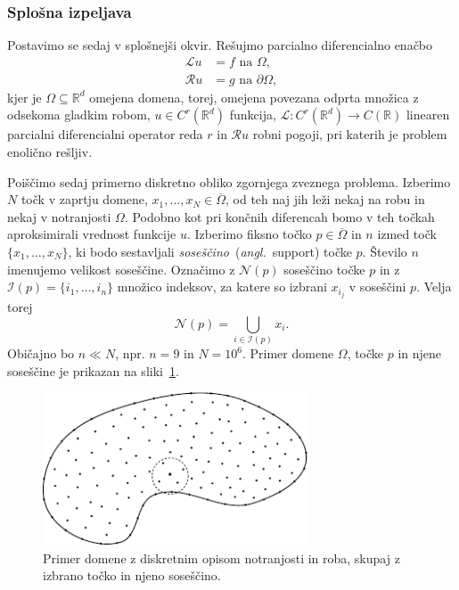 \documentclass[12pt,a4paper,twoside]{article}
\theoremstyle{definition} %
\theoremstyle{plain} %
\numberwithin{equation}{section}
\newcommand{\R}{\mathbb R}
\newcommand{\Rc}{\mathcal{R}}
\newcommand{\Nc}{\mathcal{N}}
\newcommand{\I}{\mathcal{I}}
\renewcommand{\L}{\mathcal{L}}
\newcommand{\zomega}{\overline{\Omega}}
\newcommand{\ang}[1]{(\textit{angl.}\ #1)}
\begin{document}
\subsubsection{Splošna izpeljava}
\label{sec:splosna-izpeljava}
Postavimo se sedaj v splošnejši okvir.
Rešujmo parcialno diferencialno enačbo
\begin{align}
  \L u &= f \text{ na } \Omega, \label{eq:general-problem} \\
  \Rc u &= g \text{ na } \partial \Omega \nonumber,
\end{align}
kjer je $\Omega \subseteq \R^d$ omejena domena, torej, omejena povezana odprta
množica z odsekoma gladkim robom, $u \in C^r(\R^d)$ funkcija,
$\L\colon C^r(\R^d) \to C(\R)$ linearen
parcialni diferencialni operator reda $r$ in $\Rc u$ robni pogoji,
pri katerih je problem enolično rešljiv.

Poiščimo sedaj primerno diskretno obliko zgornjega zveznega problema.
Izberimo $N$ točk v zaprtju domene, $x_1, \dots, x_N \in \zomega$, od teh naj jih leži nekaj na robu
in nekaj v notranjosti $\Omega$. Podobno kot pri končnih diferencah bomo v teh točkah aproksimirali
vrednost funkcije $u$.  Izberimo fiksno točko $p \in \zomega$ in $n$ izmed točk $\{x_1, \dots,
x_N\}$, ki bodo sestavljali \emph{soseščino}~\ang{support} točke $p$. Število $n$ imenujemo velikost
soseščine.  Označimo z $\Nc(p)$ soseščino točke $p$ in z $\I(p) = \{i_1, \dots, i_n\}$ množico
indeksov, za katere so izbrani $x_{i_j}$ v soseščini $p$. Velja torej \[
  \Nc(p) = \bigcup_{i \in \I(p)} x_i.
\]
Običajno bo $n \ll N$, npr. $n = 9$ in $N = 10^6$.
Primer domene $\Omega$, točke $p$ in njene soseščine je prikazan na
sliki~\ref{fig:domain-example}.

\begin{figure}[ht]
  \centering
  \includegraphics[width=0.7\textwidth]{images/domain_theoretical.pdf}
  \caption{Primer domene z diskretnim opisom notranjosti in roba, skupaj z izbrano
  točko in njeno soseščino.}
  \label{fig:domain-example}
\end{figure}
\end{document}
